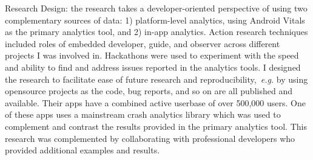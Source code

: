 \begin{SingleSpace}
Research Design: the research takes a developer-oriented perspective of using two complementary sources of data: 1) platform-level analytics, using Android Vitals as the primary analytics tool, and 2) in-app analytics.
%
%
Action research techniques included roles of embedded developer, guide, and observer across different projects I was involved in. Hackathons were used to experiment with the speed and ability to find and address issues reported in the analytics tools. 
%
I designed the research to facilitate ease of future research and reproducibility,~\emph{e.g.} by using  opensource projects as the code, bug reports, and so on are all published and available. Their apps have a combined active userbase of over 500,000 users. One of these apps uses a mainstream crash analytics library which was used to complement and contrast the results provided in the primary analytics tool.
This research was complemented by collaborating with professional developers who provided additional examples and results.



\end{SingleSpace}

